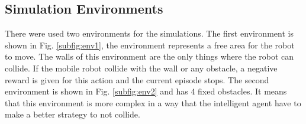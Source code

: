 
\subsection{Simulation Environments}

There were used two environments for the simulations. The first environment is  shown in Fig. \ref{subfig:env1}, the environment represents a free area for the robot to move.
The walls of this environment are the only things where the robot can collide.
If the mobile robot collide with the wall or any obstacle, a negative reward is given for this action and the current episode stops.
The second environment is shown in Fig. \ref{subfig:env2} and has 4 fixed obstacles.
It means that this environment is more complex in a way that the intelligent agent have to make a better strategy to not collide.



